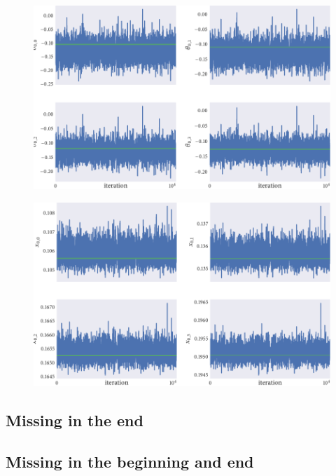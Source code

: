 \begin{figure}[tbp]
  \includegraphics{beg/dir_trace}
  \caption{}
  \label{fig:beg_dir_trace}
\end{figure}

\begin{figure}[tbp]
  \includegraphics{beg/x_trace}
  \caption{}
  \label{fig:beg_x_trace}
\end{figure}



\subsection{Missing in the end}

\subsection{Missing in the beginning and end}


